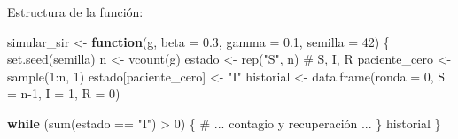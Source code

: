 \documentclass[
  letterpaper,
  DIV=11,
  numbers=noendperiod]{scrreprt}
\newenvironment{Shaded}{\begin{snugshade}}{\end{snugshade}}
\newcommand{\AttributeTok}[1]{\textcolor[rgb]{0.40,0.45,0.13}{#1}}
\newcommand{\CommentTok}[1]{\textcolor[rgb]{0.37,0.37,0.37}{#1}}
\newcommand{\ControlFlowTok}[1]{\textcolor[rgb]{0.00,0.23,0.31}{\textbf{#1}}}
\newcommand{\DecValTok}[1]{\textcolor[rgb]{0.68,0.00,0.00}{#1}}
\newcommand{\FloatTok}[1]{\textcolor[rgb]{0.68,0.00,0.00}{#1}}
\newcommand{\FunctionTok}[1]{\textcolor[rgb]{0.28,0.35,0.67}{#1}}
\newcommand{\NormalTok}[1]{\textcolor[rgb]{0.00,0.23,0.31}{#1}}
\newcommand{\OtherTok}[1]{\textcolor[rgb]{0.00,0.23,0.31}{#1}}
\newcommand{\SpecialCharTok}[1]{\textcolor[rgb]{0.37,0.37,0.37}{#1}}
\newcommand{\StringTok}[1]{\textcolor[rgb]{0.13,0.47,0.30}{#1}}
\begin{document}
\begin{tcolorbox}[enhanced jigsaw, toprule=.15mm, colframe=quarto-callout-note-color-frame, coltitle=black, titlerule=0mm, colback=white, breakable, leftrule=.75mm, arc=.35mm, bottomtitle=1mm, toptitle=1mm, rightrule=.15mm, bottomrule=.15mm, left=2mm, title=\textcolor{quarto-callout-note-color}{\faInfo}\hspace{0.5em}{💡 Pista 2}, colbacktitle=quarto-callout-note-color!10!white, opacityback=0, opacitybacktitle=0.6]

Estructura de la función:

\begin{Shaded}
\begin{Highlighting}[]
\NormalTok{simular\_sir }\OtherTok{\textless{}{-}} \ControlFlowTok{function}\NormalTok{(g, }\AttributeTok{beta =} \FloatTok{0.3}\NormalTok{, }\AttributeTok{gamma =} \FloatTok{0.1}\NormalTok{, }\AttributeTok{semilla =} \DecValTok{42}\NormalTok{) \{}
  \FunctionTok{set.seed}\NormalTok{(semilla)}
\NormalTok{  n }\OtherTok{\textless{}{-}} \FunctionTok{vcount}\NormalTok{(g)}
\NormalTok{  estado }\OtherTok{\textless{}{-}} \FunctionTok{rep}\NormalTok{(}\StringTok{"S"}\NormalTok{, n)  }\CommentTok{\# S, I, R}
\NormalTok{  paciente\_cero }\OtherTok{\textless{}{-}} \FunctionTok{sample}\NormalTok{(}\DecValTok{1}\SpecialCharTok{:}\NormalTok{n, }\DecValTok{1}\NormalTok{)}
\NormalTok{  estado[paciente\_cero] }\OtherTok{\textless{}{-}} \StringTok{"I"}
\NormalTok{  historial }\OtherTok{\textless{}{-}} \FunctionTok{data.frame}\NormalTok{(}\AttributeTok{ronda =} \DecValTok{0}\NormalTok{, }\AttributeTok{S =}\NormalTok{ n}\DecValTok{{-}1}\NormalTok{, }\AttributeTok{I =} \DecValTok{1}\NormalTok{, }\AttributeTok{R =} \DecValTok{0}\NormalTok{)}
  
  \ControlFlowTok{while}\NormalTok{ (}\FunctionTok{sum}\NormalTok{(estado }\SpecialCharTok{==} \StringTok{"I"}\NormalTok{) }\SpecialCharTok{\textgreater{}} \DecValTok{0}\NormalTok{) \{}
    \CommentTok{\# ... contagio y recuperación ...}
\NormalTok{  \}}
\NormalTok{  historial}
\NormalTok{\}}
\end{Highlighting}
\end{Shaded}

\end{tcolorbox}
\end{document}
